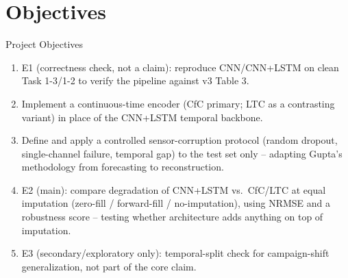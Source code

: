 \documentclass[aspectratio=169]{beamer}
\begin{document}
\section{Objectives}
\begin{frame}{Project Objectives}
  \begin{enumerate}
    \item E1 (correctness check, not a claim): reproduce CNN/CNN+LSTM on clean Task 1-3/1-2 to verify the pipeline against v3 Table 3.
    \item Implement a continuous-time encoder (CfC primary; LTC as a
      contrasting variant) in place of the CNN+LSTM temporal backbone.
    \item Define and apply a controlled sensor-corruption protocol (random
      dropout, single-channel failure, temporal gap) to the test set only --
      adapting Gupta's methodology from forecasting to reconstruction.
    \item E2 (main): compare degradation of CNN+LSTM vs.\ CfC/LTC at equal imputation (zero-fill / forward-fill / no-imputation), using NRMSE and a robustness score -- testing whether architecture adds anything on top of imputation.
    \item E3 (secondary/exploratory only): temporal-split check for campaign-shift generalization, not part of the core claim.
  \end{enumerate}
\end{frame}

\end{document}
